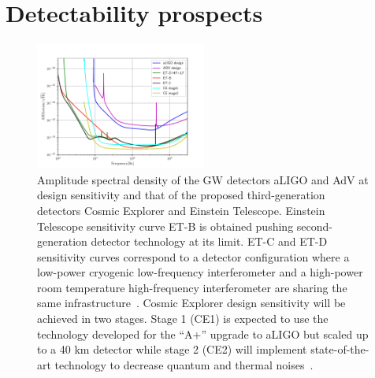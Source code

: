 \section{Detectability prospects}
\label{sec:results}

\begin{figure}[t]
 \centering
 \includegraphics[width=0.5\textwidth]{plots/spectrum}
 \caption{Amplitude spectral density of the GW detectors aLIGO and AdV at design sensitivity and that of the proposed third-generation detectors Cosmic Explorer and Einstein Telescope. Einstein Telescope sensitivity curve ET-B is obtained pushing second-generation detector technology at its limit. ET-C and ET-D sensitivity curves correspond to a detector configuration where a low-power cryogenic low-frequency interferometer and a high-power room temperature high-frequency interferometer are sharing the same infrastructure~\cite{Hild_2011}. Cosmic Explorer design sensitivity will be achieved in two stages. Stage 1 (CE1) is expected to use the technology developed for the ``A+'' upgrade to aLIGO but scaled up to a 40 km detector while stage 2 (CE2) will implement state-of-the-art technology to decrease quantum and thermal noises~\cite{reitze2019cosmic}. } \label{fig:spectrum}
\end{figure}

